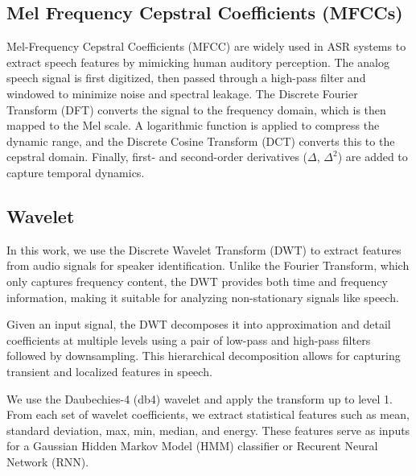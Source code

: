 \documentclass[conference]{IEEEtran}
\begin{document}
\subsection{Mel Frequency Cepstral Coefficients (MFCCs)}
Mel-Frequency Cepstral Coefficients (MFCC) are widely used in ASR systems to extract speech features by
mimicking human auditory perception. The analog speech signal is first digitized, then passed through a
high-pass filter and windowed to minimize noise and spectral leakage. The Discrete Fourier Transform (DFT)
converts the signal to the frequency domain, which is then mapped to the Mel scale. A logarithmic function
is applied to compress the dynamic range, and the Discrete Cosine Transform (DCT) converts this to the cepstral
domain. Finally, first- and second-order derivatives ($\Delta$, $\Delta^2$) are added to capture temporal dynamics. \cite{davis1980comparison}















\subsection{Wavelet}

In this work, we use the Discrete Wavelet Transform (DWT) to extract features
from audio signals for speaker identification. Unlike the Fourier Transform,
which only captures frequency content, the DWT provides both time and frequency information, making it suitable for analyzing non-stationary signals like speech.

Given an input signal, the DWT decomposes it into approximation and detail
coefficients at multiple levels using a pair of low-pass and high-pass filters followed by downsampling. This hierarchical decomposition allows for capturing transient and localized features in speech.

We use the Daubechies-4 (db4) wavelet and apply the transform up to level 1.
From each set of wavelet coefficients, we extract statistical features such as mean, standard deviation, max, min, median, and energy. These features serve as inputs for a Gaussian Hidden Markov Model (HMM) classifier or Recurent Neural Network (RNN). \cite{tufekci2000dwt}
\end{document}
